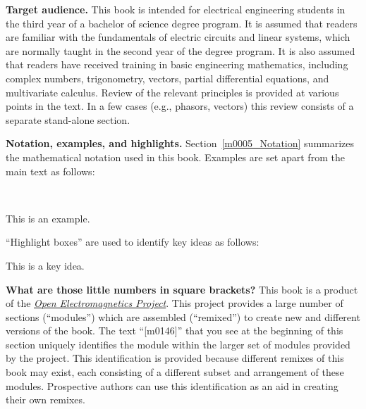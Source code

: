 {\bf Target audience.}
This book is intended for electrical engineering students in the third year of a bachelor of science degree program.
It is assumed that readers are familiar with the fundamentals of electric circuits and linear systems, which are normally taught in the second year of the degree program.  
It is also assumed that readers have received training in basic engineering mathematics, including 
complex numbers,
trigonometry,
vectors,
partial differential equations,
and multivariate calculus.
Review of the relevant principles is provided at various points in the text.
In a few cases (e.g., phasors, vectors) this review consists of a separate stand-alone section.

{\bf Notation, examples, and highlights.}
Section~\ref{m0005_Notation} summarizes the mathematical notation used in this book.
Examples are set apart from the main text as follows:

~\\ \begin{example} 
\begin{mdframed}[backgroundcolor=brown!20,linecolor=brown!20]\raggedright
This is an example.
\end{mdframed}
\end{example}

``Highlight boxes'' are used to identify key ideas as follows:

\begin{mdframed}[backgroundcolor=yellow!20,nobreak=true] 
This is a key idea.
\end{mdframed}

{\bf What are those little numbers in square brackets?}
This book is a product of the 
\hyperref[m0148_Preface-About_OpenEM]{\emph{Open Electromagnetics Project}}. %
This project provides a large number of sections (``modules'') which are assembled (``remixed'') to create new and different versions of the book.
The text ``{\color{blue}\tiny[m0146]}'' that you see at the beginning of this section uniquely identifies the module within the larger set of modules provided by the project.
This identification is provided because different remixes of this book may exist, each consisting of a different subset and arrangement of these modules. 
Prospective authors can use this identification as an aid in creating their own remixes.

